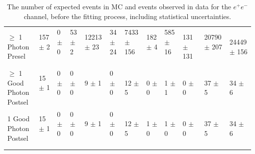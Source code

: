\begin{table}
{\begin{tabular}{|l|l|l|l|l|l|l|l|l|l|l|l|}
$\geq$ 1 Photon Presel & 157 $\pm$ 2 \ & 0 $\pm$ 0 \ & 53 $\pm$ 2 \ & 12213 $\pm$ 23 \ & 34 $\pm$ 24 \ & 7433 $\pm$ 156 \ & 182 $\pm$ 4 \ & 585 $\pm$ 16 \ & 131 $\pm$ 131\ & 20790 $\pm$ 207 \ & 24449 $\pm$ 156 \\
$\geq$ 1 Good Photon Postsel & 15 $\pm$ 1 \ & 0 $\pm$ 0 \ & 0 $\pm$ 0 \ & 9 $\pm$ 1 \ & 0 $\pm$ 0 \ & 12 $\pm$ 5 \ & 0 $\pm$ 0 \ & 1 $\pm$ 1 \ & 0 $\pm$ 0\ & 37 $\pm$ 5 \ & 34 $\pm$ 6 \\
1 Good Photon Postsel & 15 $\pm$ 1 \ & 0 $\pm$ 0 \ & 0 $\pm$ 0 \ & 9 $\pm$ 1 \ & 0 $\pm$ 0 \ & 12 $\pm$ 5 \ & 1 $\pm$ 0 \ & 1 $\pm$ 0 \ & 0 $\pm$ 0\ & 37 $\pm$ 5 \ & 34 $\pm$ 6 \\

\hline
\end{tabular}
}
\caption{The number of expected events in MC and events observed in data for the $e^+e^-$ channel, before the fitting process, including statistical uncertainties.}
\end{table}

